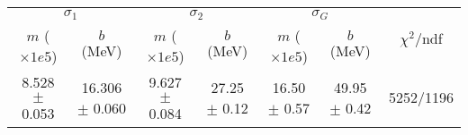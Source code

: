 \begin{tabular}{cc|cc|cc||c}
\multicolumn{2}{c|}{$\sigma_1$} & \multicolumn{2}{|c}{$\sigma_2$} & \multicolumn{2}{|c}{$\sigma_G$}  & \multirow{2}{*}{$\chi^2/$ndf}\\
$m$ ($\times1e5$) & $b$ (MeV) & $m$ ($\times1e5$) & $b$ (MeV) & $m$ ($\times1e5$) & $b$ (MeV) & \\
\hline
8.528 $\pm$ 0.053 & 16.306 $\pm$ 0.060 & 9.627 $\pm$ 0.084 & 27.25 $\pm$ 0.12 & 16.50 $\pm$ 0.57 & 49.95 $\pm$ 0.42 & 5252/1196\\
\end{tabular}
